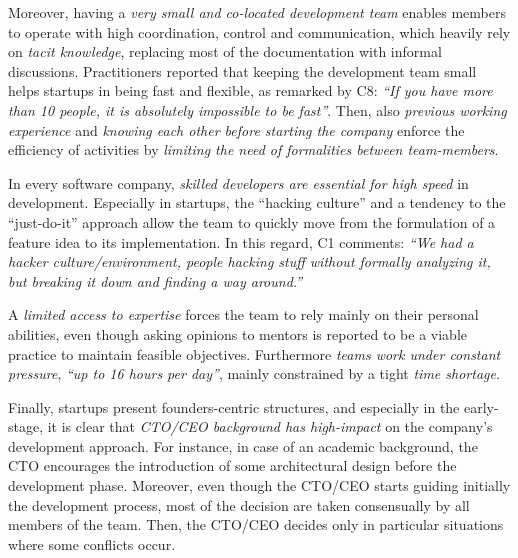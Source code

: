 \documentclass[10pt,journal,letterpaper,compsoc]{IEEEtran}
\begin{document}
Moreover, having a \textit{very small and co-located development team} enables
members to operate with high coordination, control and communication, which
heavily rely on \textit{tacit knowledge}, replacing most of the documentation
with informal discussions. Practitioners reported that keeping the development
team small helps startups in being fast and flexible, as remarked by C8:
\textit{``If you have more than 10 people, it is absolutely impossible to be
fast''}. Then, also \textit{previous working experience} and \textit{knowing
each other before starting the company} enforce the efficiency of activities by
\textit{limiting the need of formalities between team-members}.

In every software company, \textit{skilled developers are essential for high
speed} in development. Especially in startups, the ``hacking culture'' and a
tendency to the ``just-do-it'' approach allow the team to quickly move from the
formulation of a feature idea to its implementation. In this regard, C1
comments: \textit{``We had a hacker culture/environment, people hacking stuff
without formally analyzing it, but breaking it down and finding a way around.''}

A \textit{limited access to expertise} forces the team to rely mainly on their
personal abilities, even though asking opinions to mentors is reported to be a
viable practice to maintain feasible objectives. Furthermore \textit{teams work
under constant pressure}, \textit{``up to 16 hours per day''}, %
mainly constrained by a tight \textit{time shortage}.

Finally, startups present founders-centric structures, and especially in the
early-stage, it is clear that \textit{CTO/CEO background has high-impact} on the
company's development approach. For instance, in case of an academic background,
the CTO encourages the introduction of some architectural design before the
development phase. Moreover, even though the CTO/CEO starts guiding initially
the development process, most of the decision are taken consensually by all
members of the team. Then, the CTO/CEO decides only in particular situations
where some conflicts occur.
\end{document}
